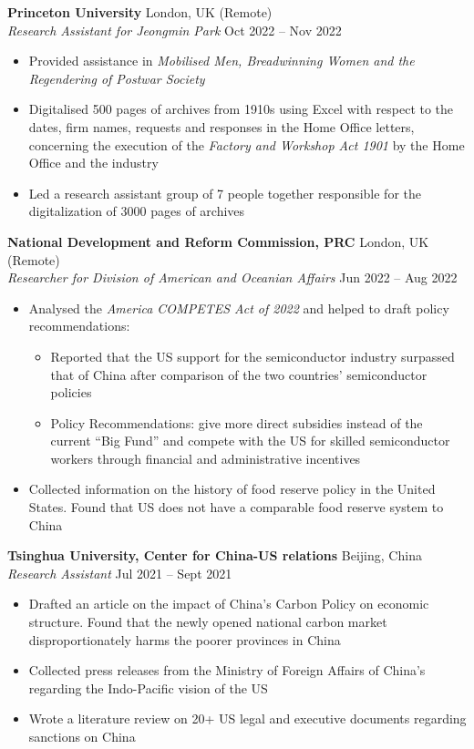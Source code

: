 \documentclass[a4paper,9pt]{extarticle}
\begin{document}
\noindent
\textbf{Princeton University} \hfill London, UK (Remote) \\
\textit{Research Assistant for Jeongmin Park} \hfill Oct 2022 – Nov 2022 %
\begin{itemize}
    \item Provided assistance in \textit{Mobilised Men, Breadwinning Women and the Regendering of Postwar Society}
    \item Digitalised 500 pages of archives from 1910s using Excel with respect to the dates, firm names, requests and responses in the Home Office letters, concerning the execution of the \textit{Factory and Workshop Act 1901} by the Home Office and the industry
    \item Led a research assistant group of 7 people together responsible for the digitalization of 3000 pages of archives
\end{itemize}
\noindent
\textbf{National Development and Reform Commission, PRC } \hfill London, UK (Remote) \\
\textit{Researcher for Division of American and Oceanian Affairs} \hfill Jun 2022 – Aug 2022 %
\begin{itemize}
    \item Analysed the \textit{America COMPETES Act of 2022} and helped to draft policy recommendations:
    \begin{itemize}
        \item Reported that the US support for the semiconductor industry surpassed that of China after comparison of the two countries’ semiconductor policies
        \item Policy Recommendations: give more direct subsidies instead of the current “Big Fund” and compete with the US for skilled semiconductor workers through financial and administrative incentives
    \end{itemize}
    \item Collected information on the history of food reserve policy in the United States. Found that US does not have a comparable food reserve system to China
\end{itemize}
\noindent
\textbf{Tsinghua University, Center for China-US relations} \hfill Beijing, China\\
\textit{Research Assistant} \hfill Jul 2021 – Sept 2021
\begin{itemize}
    \item Drafted an article on the impact of China’s Carbon Policy on economic structure. Found that the newly opened national carbon market disproportionately harms the poorer provinces in China
    \item Collected press releases from the Ministry of Foreign Affairs of China’s regarding the Indo-Pacific vision of the US
    \item Wrote a literature review on 20+ US legal and executive documents regarding sanctions on China
\end{itemize}
\end{document}

